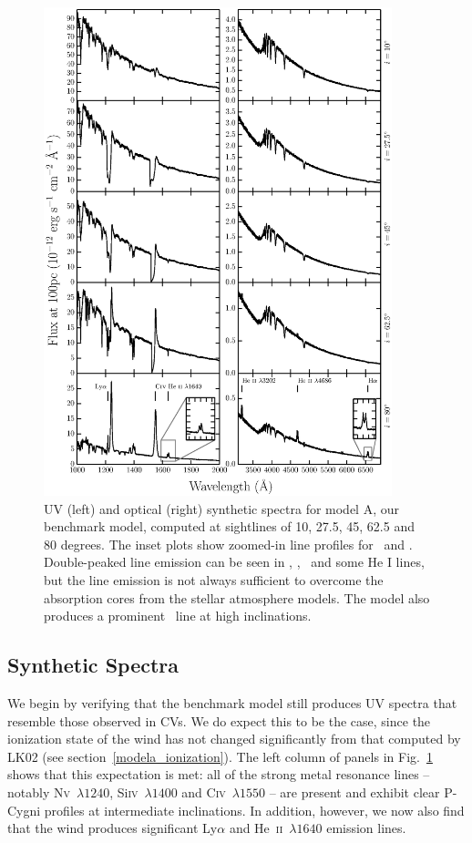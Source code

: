 \documentclass[preprint, a4paper, 11pt]{aastex}
\begin{document}
\begin{figure} %
\includegraphics[width=0.9\textwidth]{figures/modela_uv_opt.eps}
\caption{
UV (left) and optical (right) synthetic spectra for model A, our benchmark model,
computed at sightlines of 10, 27.5, 45, 62.5 and 80 degrees.	
The inset plots show zoomed-in line profiles for 
\heiiuv\ and \ha. Double-peaked line emission can be seen in 
\heiiuv, \heiiopt, \ha\ and some He I lines, but the 
line emission is not always sufficient to overcome the absorption
cores from the stellar atmosphere models. The model
also produces a prominent \heiioptnew\ line at high inclinations.
}
\label{spec}
\end{figure} %



\subsection{Synthetic Spectra}
\label{modela_spectrum}

We begin by verifying that the benchmark model still produces UV
spectra that resemble those observed in CVs. We do expect this to be
the case, since the ionization state of the wind has not changed
significantly from that computed by LK02 (see section~\ref{modela_ionization}). 
The left column of panels in Fig.~\ref{spec} shows that this expectation
is met: all of the strong metal resonance
lines -- notably N\textsc{v}~$\lambda1240$,
Si\textsc{iv}~$\lambda1400$ and C\textsc{iv}~$\lambda1550$ -- 
are present and exhibit clear P-Cygni profiles
at intermediate inclinations. In addition, however, we now also find
that the wind produces significant Ly$\alpha$ and
He~\textsc{ii}~$\lambda1640$ emission lines. 
\end{document}
